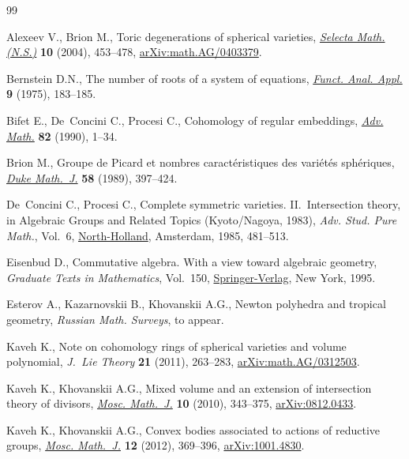 \documentclass[pdftex]{sigma}
\numberwithin{equation}{section}
\theoremstyle{definition}
\begin{document}
\begin{thebibliography}{99}
\footnotesize\itemsep=-0.5pt

Alexeev V., Brion M., Toric degenerations of spherical varieties,
 \href{https://doi.org/10.1007/s00029-005-0396-8}{\textit{Selecta Math. (N.S.)}} \textbf{10} (2004), 453--478, \href{https://arxiv.org/abs/math.AG/0403379}{arXiv:math.AG/0403379}.

Bernstein D.N., The number of roots of a system of equations, \href{https://doi.org/10.1007/BF01075595}{\textit{Funct.
 Anal. Appl.}} \textbf{9} (1975), 183--185.

Bifet E., De~Concini C., Procesi C., Cohomology of regular embeddings,
 \href{https://doi.org/10.1016/0001-8708(90)90082-X}{\textit{Adv. Math.}} \textbf{82} (1990), 1--34.

Brion M., Groupe de {P}icard et nombres caract\'{e}ristiques des
 vari\'{e}t\'{e}s sph\'{e}riques, \href{https://doi.org/10.1215/S0012-7094-89-05818-3}{\textit{Duke Math.~J.}} \textbf{58} (1989), 397--424.

De~Concini C., Procesi C., Complete symmetric varieties. {II}.~{I}ntersection
 theory, in Algebraic Groups and Related Topics ({K}yoto/{N}agoya, 1983),
 \textit{Adv. Stud. Pure Math.}, Vol.~6, \href{https://doi.org/10.2969/aspm/00610481}{North-Holland}, Amsterdam, 1985, 481--513.

Eisenbud D., Commutative algebra. With a view toward algebraic geometry,
 \textit{Graduate Texts in Mathematics}, Vol.~150, \href{https://doi.org/10.1007/978-1-4612-5350-1}{Springer-Verlag}, New York,
 1995.

Esterov A., Kazarnovskii B., Khovanskii A.G., Newton polyhedra and tropical
 geometry, \textit{Russian Math. Surveys}, {t}o appear.

Kaveh K., Note on cohomology rings of spherical varieties and volume
 polynomial, \textit{J.~Lie Theory} \textbf{21} (2011), 263--283,
 \href{https://arxiv.org/abs/math.AG/0312503}{arXiv:math.AG/0312503}.

Kaveh K., Khovanskii A.G., Mixed volume and an extension of intersection theory
 of divisors, \href{https://doi.org/10.17323/1609-4514-2010-10-2-343-375}{\textit{Mosc. Math.~J.}} \textbf{10} (2010), 343--375,
 \href{https://arxiv.org/abs/0812.0433}{arXiv:0812.0433}.

Kaveh K., Khovanskii A.G., Convex bodies associated to actions of reductive
 groups, \href{https://doi.org/10.17323/1609-4514-2012-12-2-369-396}{\textit{Mosc. Math.~J.}} \textbf{12} (2012), 369--396, \href{https://arxiv.org/abs/1001.4830}{arXiv:1001.4830}.


\end{thebibliography}
\end{document}
